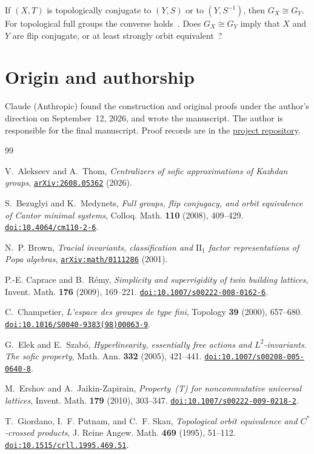 \documentclass[11pt]{amsart}
\newcommand{\doi}[1]{\href{https://doi.org/#1}{\nolinkurl{doi:#1}}}
\newcommand{\arxiv}[1]{\href{https://arxiv.org/abs/#1}{\nolinkurl{arXiv:#1}}}
\begin{document}
If $(X,T)$ is topologically conjugate to $(Y,S)$ or to $(Y,S^{-1})$, then
$G_X\cong G_Y$. For topological full groups the converse
holds~\cite{GPS99,BezuglyiMedynets}. Does $G_X\cong G_Y$ imply that $X$ and
$Y$ are flip conjugate, or at least strongly orbit equivalent~\cite{GPS}?

\section*{Origin and authorship}
Claude (Anthropic) found the construction and original proofs under
the author's direction on September~12, 2026, and wrote the manuscript.
The author is responsible for the final manuscript. Proof records are
in the \href{https://github.com/SauersML/group-approximation}{project repository}.

\begin{thebibliography}{99}


V.~Alekseev and A.~Thom,
\emph{Centralizers of sofic approximations of Kazhdan groups},
\arxiv{2608.05362} (2026).

S.~Bezuglyi and K.~Medynets,
\emph{Full groups, flip conjugacy, and orbit equivalence of Cantor minimal
systems}, Colloq. Math. \textbf{110} (2008), 409--429.
\doi{10.4064/cm110-2-6}.

N.~P. Brown, \emph{Tracial invariants, classification and
$\mathrm{II}_1$ factor representations of Popa algebras},
\arxiv{math/0111286} (2001).

P.-E. Caprace and B.~R\'emy, \emph{Simplicity and superrigidity of twin
building lattices}, Invent. Math. \textbf{176} (2009), 169--221.
\doi{10.1007/s00222-008-0162-6}.

C.~Champetier, \emph{L'espace des groupes de type fini}, Topology
\textbf{39} (2000), 657--680. \doi{10.1016/S0040-9383(98)00063-9}.

G.~Elek and E.~Szab\'o, \emph{Hyperlinearity, essentially free actions and
$L^2$-invariants. The sofic property}, Math. Ann. \textbf{332} (2005),
421--441. \doi{10.1007/s00208-005-0640-8}.

M.~Ershov and A.~Jaikin-Zapirain,
\emph{Property~\textup{(T)} for noncommutative universal lattices},
Invent. Math. \textbf{179} (2010), 303--347.
\doi{10.1007/s00222-009-0218-2}.

T.~Giordano, I.~F. Putnam, and C.~F. Skau,
\emph{Topological orbit equivalence and $C^*$-crossed products},
J. Reine Angew. Math. \textbf{469} (1995), 51--112.
\doi{10.1515/crll.1995.469.51}.


\end{thebibliography}
\end{document}
